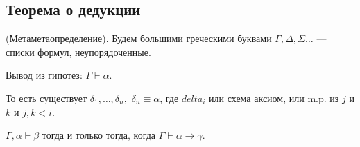 \subsection{Теорема о дедукции}

\begin{definition}
    (Метаметаопределение).
    Будем большими греческими буквами $\Gamma, \Delta, \Sigma\ldots$ --- списки формул, неупорядоченные.
\end{definition}

\begin{definition}
    Вывод из гипотез: $\Gamma \vdash \alpha$.

    То есть существует $\delta_1,\dots, \delta_n$,~$\delta_n \equiv \alpha$, где $delta_i$ или схема аксиом, или m.p. из $j$ и $k$ и $j, k < i$.
\end{definition}

\begin{theorem}
    $ \Gamma, \alpha \vdash \beta$ тогда и только тогда, когда $\Gamma \vdash \alpha \to \gamma$.
\end{theorem}

